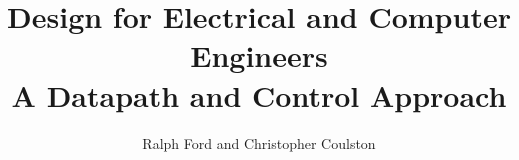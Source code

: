 \documentclass[11pt]{book}
\begin{document}
\frontmatter
\title{{\Huge Design for Electrical and Computer Engineers} \\
				A Datapath and Control Approach}
\author{Ralph Ford and Christopher Coulston}
\date{}
\maketitle

\begin{titlepage}
\center
\end{titlepage}



\tableofcontents

\mainmatter

\appendix

\printindex
\end{document}
